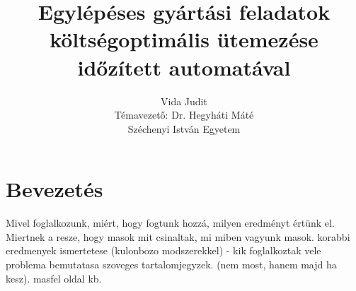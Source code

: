 \documentclass {report}
\begin{document}
\title{Egylépéses gyártási feladatok költségoptimális ütemezése időzített automatával}

\author{Vida Judit\\Témavezető: Dr. Hegyháti Máté\\Széchenyi István Egyetem}
\maketitle


\tableofcontents
\chapter{Bevezetés}
Mivel foglalkozunk,  miért, hogy fogtunk hozzá, milyen eredményt értünk el.
Miertnek a resze, hogy masok mit csinaltak, mi miben vagyunk masok.
korabbi eredmenyek ismertetese (kulonbozo modszerekkel) - kik foglalkoztak vele\\ problema bemutatasa
szoveges tartalomjegyzek. (nem most, hanem majd ha kesz).
masfel oldal kb.
\end{document}
